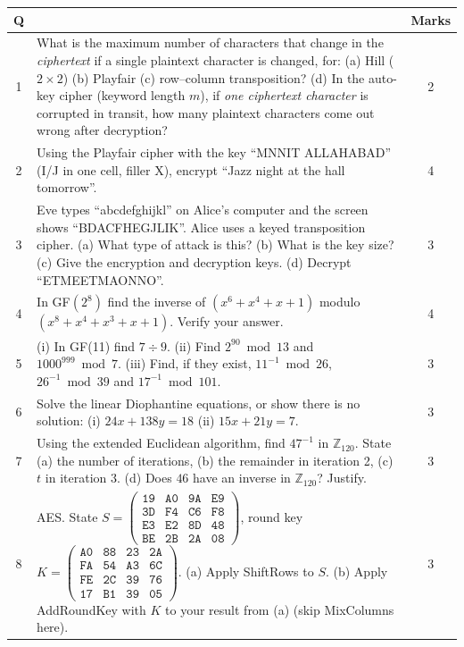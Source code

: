 \begin{center}\small
\begin{tabularx}{\textwidth}{|c|X|c|}
\hline
\textbf{Q} & & \textbf{Marks}\\\hline
1 & What is the maximum number of characters that change in the \emph{ciphertext} if a single plaintext character is changed, for: (a) Hill ($2\times2$) (b) Playfair (c) row--column transposition? (d) In the auto-key cipher (keyword length $m$), if \emph{one ciphertext character} is corrupted in transit, how many plaintext characters come out wrong after decryption? & 2\\\hline
2 & Using the Playfair cipher with the key ``MNNIT ALLAHABAD'' (I/J in one cell, filler X), encrypt ``Jazz night at the hall tomorrow''. & 4\\\hline
3 & Eve types ``abcdefghijkl'' on Alice's computer and the screen shows ``BDACFHEGJLIK''. Alice uses a keyed transposition cipher.
(a) What type of attack is this? (b) What is the key size? (c) Give the encryption and decryption keys. (d) Decrypt ``ETMEETMAONNO''. & 3\\\hline
4 & In GF$(2^8)$ find the inverse of $(x^6 + x^4 + x + 1)$ modulo $(x^8 + x^4 + x^3 + x + 1)$. Verify your answer. & 4\\\hline
5 & (i) In GF(11) find $7 \div 9$. (ii) Find $2^{90} \bmod 13$ and $1000^{999} \bmod 7$. (iii) Find, if they exist, $11^{-1} \bmod 26$, $26^{-1} \bmod 39$ and $17^{-1} \bmod 101$. & 3\\\hline
6 & Solve the linear Diophantine equations, or show there is no solution: (i) $24x + 138y = 18$ (ii) $15x + 21y = 7$. & 3\\\hline
7 & Using the extended Euclidean algorithm, find $47^{-1}$ in $\mathbb{Z}_{120}$. State (a) the number of iterations, (b) the remainder in iteration 2, (c) $t$ in iteration 3. (d) Does $46$ have an inverse in $\mathbb{Z}_{120}$? Justify. & 3\\\hline
8 & AES. State $S = \begin{pmatrix}\mathtt{19}&\mathtt{A0}&\mathtt{9A}&\mathtt{E9}\\\mathtt{3D}&\mathtt{F4}&\mathtt{C6}&\mathtt{F8}\\\mathtt{E3}&\mathtt{E2}&\mathtt{8D}&\mathtt{48}\\\mathtt{BE}&\mathtt{2B}&\mathtt{2A}&\mathtt{08}\end{pmatrix}$, round key $K = \begin{pmatrix}\mathtt{A0}&\mathtt{88}&\mathtt{23}&\mathtt{2A}\\\mathtt{FA}&\mathtt{54}&\mathtt{A3}&\mathtt{6C}\\\mathtt{FE}&\mathtt{2C}&\mathtt{39}&\mathtt{76}\\\mathtt{17}&\mathtt{B1}&\mathtt{39}&\mathtt{05}\end{pmatrix}$.
(a) Apply ShiftRows to $S$. (b) Apply AddRoundKey with $K$ to your result from (a) (skip MixColumns here). & 3\\\hline
\end{tabularx}
\end{center}

